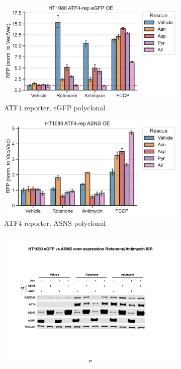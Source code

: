 \begin{figure}[ht]
     \centering
     \begin{subfigure}[b]{0.49\textwidth}
         \includegraphics[width=\textwidth]{figures/sapp/ISR/HT1080_ATF4rep_eGFP_OE.pdf}
         \caption{ATF4 reporter, eGFP polyclonal}
         \label{fig:sapp:ISR:HT1080_ATF4rep_eGFP_OE}
     \end{subfigure}
     \hfill
     \begin{subfigure}[b]{0.49\textwidth}
         \includegraphics[width=\textwidth]{figures/sapp/ISR/HT1080_ATF4rep_ASNS_OE.pdf}
         \caption{ATF4 reporter, ASNS polyclonal}
         \label{fig:sapp:ISR:HT1080_ATF4rep_ASNS_OE}
     \end{subfigure}
     \hfill
     \begin{subfigure}[b]{0.6\textwidth}
         \centering
         \includegraphics[width=\textwidth]{figures/sapp/ISR/HT1080_ISR_ASNS_OE.pdf}

\end{subfigure}
\end{figure}
